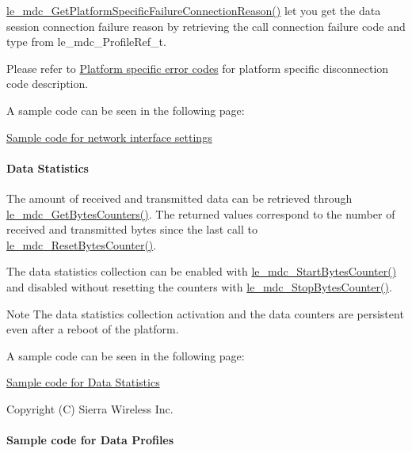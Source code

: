 \hyperlink{le__mdc__interface_8h_a438ff354100b5020ace1059635b740b4}{le\+\_\+mdc\+\_\+\+Get\+Platform\+Specific\+Failure\+Connection\+Reason()} let you get the data session connection failure reason by retrieving the call connection failure code and type from {\ttfamily le\+\_\+mdc\+\_\+\+Profile\+Ref\+\_\+t}.

Please refer to \hyperlink{platformConstraintsSpecificErrorCodes}{Platform specific error codes} for platform specific disconnection code description.

A sample code can be seen in the following page\+:
\begin{DoxyItemize}
\item \hyperlink{c_mdcDataSessions}{Sample code for network interface settings}
\end{DoxyItemize}\hypertarget{c_mdc_le_mdc_dataStatistics}{}\paragraph{Data Statistics}\label{c_mdc_le_mdc_dataStatistics}
The amount of received and transmitted data can be retrieved through \hyperlink{le__mdc__interface_8h_aaad833c105f7d0ae77f18195d6739080}{le\+\_\+mdc\+\_\+\+Get\+Bytes\+Counters()}. The returned values correspond to the number of received and transmitted bytes since the last call to \hyperlink{le__mdc__interface_8h_a63636b2779d2ee6a6520ebfb2d26666c}{le\+\_\+mdc\+\_\+\+Reset\+Bytes\+Counter()}.

The data statistics collection can be enabled with \hyperlink{le__mdc__interface_8h_a30f390941d98c9e9c4144a5e035da3aa}{le\+\_\+mdc\+\_\+\+Start\+Bytes\+Counter()} and disabled without resetting the counters with \hyperlink{le__mdc__interface_8h_a1d6007bc8f84e5e4869af4af11b7363f}{le\+\_\+mdc\+\_\+\+Stop\+Bytes\+Counter()}.

\begin{DoxyNote}{Note}
The data statistics collection activation and the data counters are persistent even after a reboot of the platform.
\end{DoxyNote}
A sample code can be seen in the following page\+:
\begin{DoxyItemize}
\item \hyperlink{c_mdcDataStatistics}{Sample code for Data Statistics}
\end{DoxyItemize}





Copyright (C) Sierra Wireless Inc. \hypertarget{c_mdcDataProfiles}{}\paragraph{Sample code for Data Profiles}\label{c_mdcDataProfiles}

